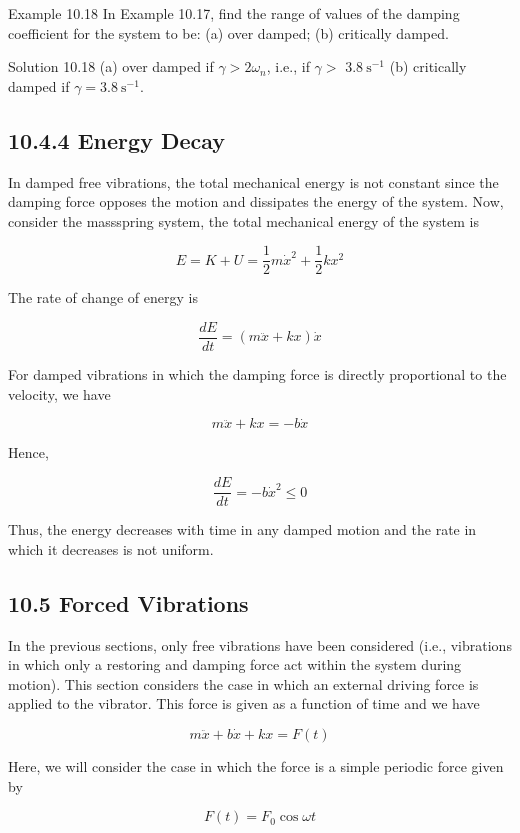 \documentclass[10pt]{article}
\begin{document}
Example 10.18 In Example 10.17, find the range of values of the damping coefficient for the system to be: (a) over damped; (b) critically damped.

Solution 10.18 (a) over damped if $\gamma>2 \omega_{n}$, i.e., if $\gamma>$ $3.8 \mathrm{~s}^{-1}$ (b) critically damped if $\gamma=3.8 \mathrm{~s}^{-1}$.

\subsection*{10.4.4 Energy Decay}
In damped free vibrations, the total mechanical energy is not constant since the damping force opposes the motion and dissipates the energy of the system. Now, consider the massspring system, the total mechanical energy of the system is

$$
E=K+U=\frac{1}{2} m \dot{x}^{2}+\frac{1}{2} k x^{2}
$$

The rate of change of energy is

$$
\frac{d E}{d t}=(m \ddot{x}+k x) \dot{x}
$$

For damped vibrations in which the damping force is directly proportional to the velocity, we have

$$
m \ddot{x}+k x=-b \dot{x}
$$

Hence,

$$
\frac{d E}{d t}=-b \dot{x}^{2} \leq 0
$$

Thus, the energy decreases with time in any damped motion and the rate in which it decreases is not uniform.

\subsection*{10.5 Forced Vibrations}
In the previous sections, only free vibrations have been considered (i.e., vibrations in which only a restoring and damping force act within the system during motion). This section considers the case in which an external driving force is applied to the vibrator. This force is given as a function of time and we have


\begin{equation*}
m \ddot{x}+b \dot{x}+k x=F(t) \tag{10.19}
\end{equation*}


Here, we will consider the case in which the force is a simple periodic force given by


\begin{equation*}
F(t)=F_{0} \cos \omega t \tag{10.20}
\end{equation*}
\end{document}
